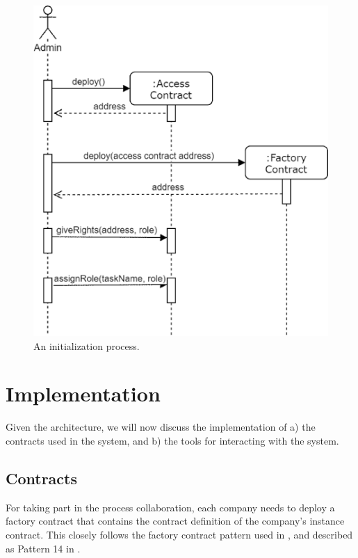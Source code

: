 \documentclass[runningheads]{llncs}
\begin{document}
\begin{figure}
\includegraphics[width=\textwidth]{fig/initialization.eps}
\caption{An initialization process.} \label{fig2}
\end{figure}

\section{Implementation}

Given the architecture, we will now discuss the implementation of a) the contracts used in the system, and b) the tools for interacting with the system.

\subsection{Contracts}

For taking part in the process collaboration, each company needs to deploy a factory contract that contains the contract definition of the company's instance contract.
This closely follows the factory contract pattern used in \cite{weber2016untrusted}, and described as Pattern 14 in \cite{xu2018pattern}.
\end{document}
